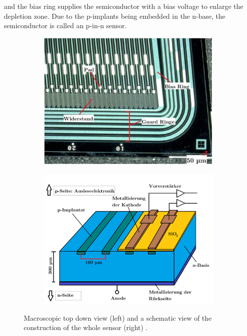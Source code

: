 and the bias ring supplies the semiconductor with a bias voltage to enlarge the depletion zone. Due to the p-implants
being embedded in the n-base, the semiconductor is called an p-in-n sensor.
\begin{figure}
    \centering
    \begin{subfigure}{0.45\textwidth}
      \includegraphics[width = \textwidth]{content/pics/Silicon_Sensor_TOPDOWN.png}
    \end{subfigure}
    \hfill
    \begin{subfigure}{0.45\textwidth}
      \includegraphics[width = \textwidth]{content/pics/Silicon_Sensor_SCHEMATIC.png}
    \end{subfigure}    
    \caption{Macroscopic top down view (left) and a schematic view of the construction of the whole sensor (right) \cite{SiliconStrip}.}
    \label{fig:sensor}
  \end{figure}\\
